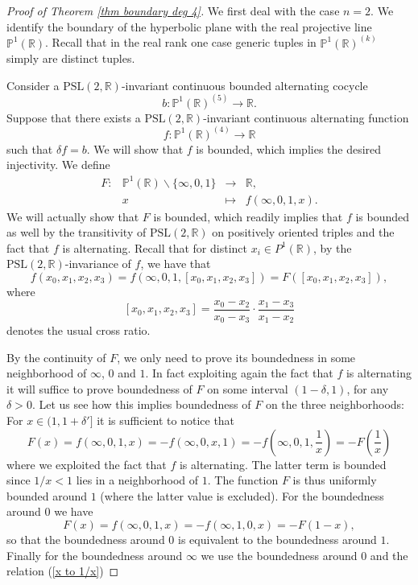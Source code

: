 \documentclass[a4paper]{amsart}
\theoremstyle{definition}
\theoremstyle{remark}
\theoremstyle{TheoremNum}
\renewcommand{\setminus}{\smallsetminus}
\begin{document}
\begin{proof}[Proof of Theorem \ref{thm boundary deg 4}] We first deal with the case $n=2$. We identify the boundary of the hyperbolic plane with the real projective line $\mathbb{P}^1(\mathbb{R})$. Recall that in the real rank one case generic tuples in $\mathbb{P}^1(\mathbb{R})^{(k)}$ simply are distinct tuples.

Consider a $\mathrm{PSL}(2,\mathbb{R})$-invariant continuous bounded alternating cocycle
$$
b:\mathbb{P}^1(\mathbb{R})^{(5)} \longrightarrow \mathbb{R}. 
$$
Suppose that there exists a $\mathrm{PSL}(2,\mathbb{R})$-invariant continuous alternating function 
$$
f:\mathbb{P}^1(\mathbb{R})^{(4)} \longrightarrow \mathbb{R}
$$
such that $\delta f=b$. We will show that $f$ is bounded, which implies the desired injectivity. We define
$$\begin{array}{rrcl}
F:&\mathbb{P}^1(\mathbb{R}) \setminus \{\infty,0,1\}& \longrightarrow& \mathbb{R},\\
&x&\longmapsto &f(\infty,0,1,x).
\end{array}$$
We will actually show that $F$ is bounded, which readily implies that $f$ is bounded as well by the transitivity of $\mathrm{PSL}(2,\mathbb{R})$ on positively oriented triples and the fact that $f$ is alternating. Recall that for distinct $x_i\in P^1(\mathbb{R})$, by the $\mathrm{PSL}(2,\mathbb{R})$-invariance of $f$, we have that 
$$f(x_0,x_1,x_2,x_3)=f(\infty,0,1,[x_0,x_1,x_2,x_3])=F([x_0,x_1,x_2,x_3]),$$
 where 
$$[x_0,x_1,x_2,x_3]=\frac{x_0-x_2}{x_0-x_3}\cdot \frac{x_1-x_3}{x_1-x_2}$$
denotes the usual cross ratio. 

By the continuity of $F$, we only need to prove its boundedness in some neighborhood of $\infty$, $0$ and $1$. In fact exploiting again the fact that $f$ is alternating it will suffice to prove boundedness of $F$ on some interval $(1-\delta,1)$, for any $\delta>0$. Let us see how this implies boundedness of $F$ on the three neighborhoods: For $x \in (1,1+\delta']$ it is sufficient to notice that 
\begin{equation}\label{x to 1/x}
F(x)=f(\infty,0,1,x)=-f(\infty,0,x,1)=-f\left(\infty,0,1,\frac{1}{x}\right)=-F\left(\frac{1}{x}\right)
\end{equation}
where we exploited the fact that $f$ is alternating. The latter term is bounded since $1/x<1$ lies in a neighborhood of $1$.  The function $F$ is thus uniformly bounded around $1$ (where the latter value is excluded). For the boundedness around $0$ we have
$$F(x)=f(\infty,0,1,x)=-f(\infty,1,0,x)=-F(1-x),$$
so that the boundedness around $0$ is equivalent to the boundedness around $1$. Finally for the boundedness around $\infty$ we use the boundedness around $0$ and the relation (\ref{x to 1/x})



\end{proof}
\end{document}
